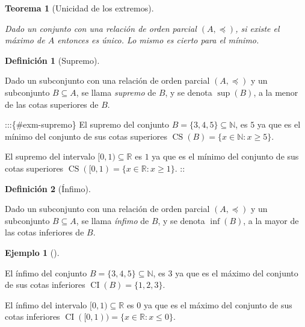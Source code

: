 \documentclass[
  a4paper,
]{scrreport}
\theoremstyle{plain}
\theoremstyle{plain}
\newtheorem{theorem}{Teorema}[chapter]
\theoremstyle{definition}
\newtheorem{definition}{Definición}[chapter]
\theoremstyle{definition}
\newtheorem{example}{Ejemplo}[chapter]
\theoremstyle{plain}
\theoremstyle{definition}
\theoremstyle{remark}
\begin{document}
\begin{theorem}[Unicidad de los
extremos]\protect\hypertarget{thm-unicidad-extremos}{}\label{thm-unicidad-extremos}

Dado un conjunto con una relación de orden parcial \((A,\preceq)\), si
existe el máximo de \(A\) entonces es único. Lo mismo es cierto para el
mínimo.

\end{theorem}

\begin{definition}[Supremo]\protect\hypertarget{def-supremo-conjunto}{}\label{def-supremo-conjunto}

Dado un subconjunto con una relación de orden parcial \((A,\preceq)\) y
un subconjunto \(B\subseteq A\), se llama \emph{supremo} de \(B\), y se
denota \(\sup(B)\), a la menor de las cotas superiores de \(B\).

\end{definition}

:::\{\#exm-supremo\} El supremo del conjunto
\(B=\{3, 4, 5\}\subseteq \mathbb{N}\), es \(5\) ya que es el mínimo del
conjunto de sus cotas superiores
\(\operatorname{CS}(B)=\{x\in \mathbb{N}:x\geq 5\}\).

El supremo del intervalo \([0,1)\subseteq \mathbb{R}\) es \(1\) ya que
es el mínimo del conjunto de sus cotas superiores
\(\operatorname{CS}([0,1) = \{x\in \mathbb{R}:x\geq 1\}\). ::

\begin{definition}[Ínfimo]\protect\hypertarget{def-infimo-conjunto}{}\label{def-infimo-conjunto}

Dado un subconjunto con una relación de orden parcial \((A,\preceq)\) y
un subconjunto \(B\subseteq A\), se llama \emph{ínfimo} de \(B\), y se
denota \(\inf(B)\), a la mayor de las cotas inferiores de \(B\).

\end{definition}

\begin{example}[]\protect\hypertarget{exm-infimo}{}\label{exm-infimo}

El ínfimo del conjunto \(B=\{3, 4, 5\}\subseteq \mathbb{N}\), es \(3\)
ya que es el máximo del conjunto de sus cotas inferiores
\(\operatorname{CI}(B)=\{1, 2, 3\}\).

El ínfimo del intervalo \([0,1)\subseteq \mathbb{R}\) es \(0\) ya que es
el máximo del conjunto de sus cotas inferiores
\(\operatorname{CI}([0,1)) = \{x\in \mathbb{R}:x\leq 0\}\).

\end{example}
\end{document}
